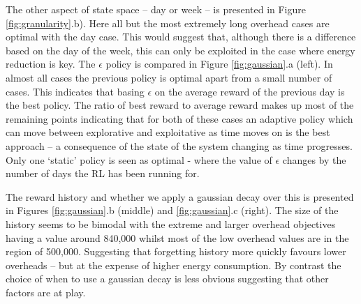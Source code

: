 \documentclass[10pt, conference, compsocconf]{IEEEtran}
\begin{document}
The other aspect of state space -- day or week -- is presented in Figure \ref{fig:granularity}.b). Here all but the most extremely long overhead cases are optimal with the day case. This would suggest that, although there is a difference based on the day of the week, this can only be exploited in the case where energy reduction is key.
%
%
The $\epsilon$ policy is compared in Figure \ref{fig:gaussian}.a (left). In almost all cases the previous policy is optimal apart from a small number of cases. This indicates that basing $\epsilon$ on the average reward of the previous day is the best policy. The ratio of best reward to average reward makes up most of the remaining points indicating that for both of these cases an adaptive policy which can move between explorative and exploitative as time moves on is the best approach -- a consequence of the state of the system changing as time progresses. Only one `static' policy is seen as optimal - where the value of $\epsilon$ changes by the number of days the RL has been running for.

%

The reward history and whether we apply a gaussian decay over this is presented in Figures \ref{fig:gaussian}.b (middle) and \ref{fig:gaussian}.c (right). The size of the history seems to be bimodal with the extreme and larger overhead objectives having a value around 840,000 whilst most of the low overhead values are in the region of 500,000. Suggesting that forgetting history more quickly favours lower overheads -- but at the expense of higher energy consumption. {\color{green}By contrast the choice of when to use a gaussian decay is less obvious suggesting that other factors are at play.} 

\end{document}
